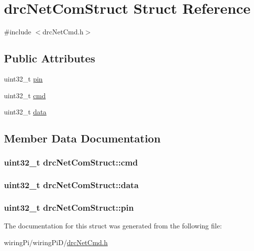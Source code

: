 \hypertarget{structdrcNetComStruct}{\section{drc\-Net\-Com\-Struct Struct Reference}
\label{structdrcNetComStruct}
}


{\ttfamily \#include $<$drc\-Net\-Cmd.\-h$>$}

\subsection*{Public Attributes}
\begin{DoxyCompactItemize}
\item 
uint32\-\_\-t \hyperlink{structdrcNetComStruct_a71861aef3f288842ffaad1f4ad3830d8}{pin}
\item 
uint32\-\_\-t \hyperlink{structdrcNetComStruct_abffbc20e01219a8f2850a53d2ba4d4ce}{cmd}
\item 
uint32\-\_\-t \hyperlink{structdrcNetComStruct_a728fa1681488d72c89e49c1b019e582e}{data}
\end{DoxyCompactItemize}


\subsection{Member Data Documentation}
\hypertarget{structdrcNetComStruct_abffbc20e01219a8f2850a53d2ba4d4ce}{
\subsubsection[{cmd}]{\setlength{\rightskip}{0pt plus 5cm}uint32\-\_\-t drc\-Net\-Com\-Struct\-::cmd}}\label{structdrcNetComStruct_abffbc20e01219a8f2850a53d2ba4d4ce}
\hypertarget{structdrcNetComStruct_a728fa1681488d72c89e49c1b019e582e}{
\subsubsection[{data}]{\setlength{\rightskip}{0pt plus 5cm}uint32\-\_\-t drc\-Net\-Com\-Struct\-::data}}\label{structdrcNetComStruct_a728fa1681488d72c89e49c1b019e582e}
\hypertarget{structdrcNetComStruct_a71861aef3f288842ffaad1f4ad3830d8}{
\subsubsection[{pin}]{\setlength{\rightskip}{0pt plus 5cm}uint32\-\_\-t drc\-Net\-Com\-Struct\-::pin}}\label{structdrcNetComStruct_a71861aef3f288842ffaad1f4ad3830d8}


The documentation for this struct was generated from the following file\-:\begin{DoxyCompactItemize}
\item 
wiring\-Pi/wiring\-Pi\-D/\hyperlink{drcNetCmd_8h}{drc\-Net\-Cmd.\-h}\end{DoxyCompactItemize}
